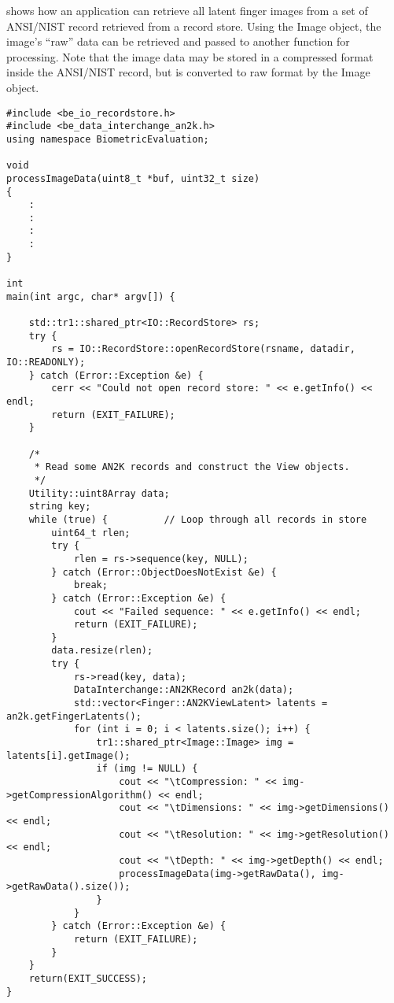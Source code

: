  shows how an application can retrieve all latent
finger images from a set of ANSI/NIST record retrieved from a record store.
Using the Image object, the image's ``raw'' data can be retrieved and passed
to another function for processing. Note that the image data may be stored
in a compressed format inside the ANSI/NIST record, but is converted to raw
format by the Image object.

\begin{lstlisting}[caption={Retrieving ANSI/NIST Records}, label=an2klatentuse]
#include <be_io_recordstore.h>
#include <be_data_interchange_an2k.h>
using namespace BiometricEvaluation;

void
processImageData(uint8_t *buf, uint32_t size)
{
    :
    :
    :
    :
}

int
main(int argc, char* argv[]) {

    std::tr1::shared_ptr<IO::RecordStore> rs;
    try {
        rs = IO::RecordStore::openRecordStore(rsname, datadir, IO::READONLY);
    } catch (Error::Exception &e) {
        cerr << "Could not open record store: " << e.getInfo() << endl;
        return (EXIT_FAILURE);
    }

    /*
     * Read some AN2K records and construct the View objects.
     */
    Utility::uint8Array data;
    string key;
    while (true) {          // Loop through all records in store
        uint64_t rlen;
        try {
            rlen = rs->sequence(key, NULL);
        } catch (Error::ObjectDoesNotExist &e) {
            break;
        } catch (Error::Exception &e) {
            cout << "Failed sequence: " << e.getInfo() << endl;
            return (EXIT_FAILURE);
        }
        data.resize(rlen);
        try {
            rs->read(key, data);
            DataInterchange::AN2KRecord an2k(data);
            std::vector<Finger::AN2KViewLatent> latents = an2k.getFingerLatents();
            for (int i = 0; i < latents.size(); i++) {
                tr1::shared_ptr<Image::Image> img = latents[i].getImage();
                if (img != NULL) {
                    cout << "\tCompression: " << img->getCompressionAlgorithm() << endl;
                    cout << "\tDimensions: " << img->getDimensions() << endl;
                    cout << "\tResolution: " << img->getResolution() << endl;
                    cout << "\tDepth: " << img->getDepth() << endl;
                    processImageData(img->getRawData(), img->getRawData().size());
                }
            }
        } catch (Error::Exception &e) {
            return (EXIT_FAILURE);
        }
    }
    return(EXIT_SUCCESS);
}
\end{lstlisting}

